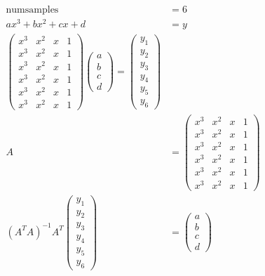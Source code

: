\documentclass[12pt]{extarticle}
\newcommand {\pmat}[1]{\begin{pmatrix}#1\end{pmatrix}}
\begin{document}

\begin{align*}
    \mathrm{num samples} &= 6 \\
    ax^3 + bx^2 + cx + d &= y \\
    \pmat {
        x^3 & x^2 & x & 1 \\
        x^3 & x^2 & x & 1 \\
        x^3 & x^2 & x & 1 \\
        x^3 & x^2 & x & 1 \\
        x^3 & x^2 & x & 1 \\
        x^3 & x^2 & x & 1
    }
    \pmat {
        a \\ b \\ c \\ d
    }
    =
    \pmat {
        y_1 \\ y_2 \\ y_3 \\ y_4 \\ y_5 \\ y_6
    } \\
    A &=
    \pmat {
        x^3 & x^2 & x & 1 \\
        x^3 & x^2 & x & 1 \\
        x^3 & x^2 & x & 1 \\
        x^3 & x^2 & x & 1 \\
        x^3 & x^2 & x & 1 \\
        x^3 & x^2 & x & 1
    } \\
    (A^TA)^{-1}A^T 
    \pmat {
        y_1 \\ y_2 \\ y_3 \\ y_4 \\ y_5 \\ y_6
    }
    &=
    \pmat {
        a \\ b \\ c \\ d
    }
\end{align*}
\end{document}

